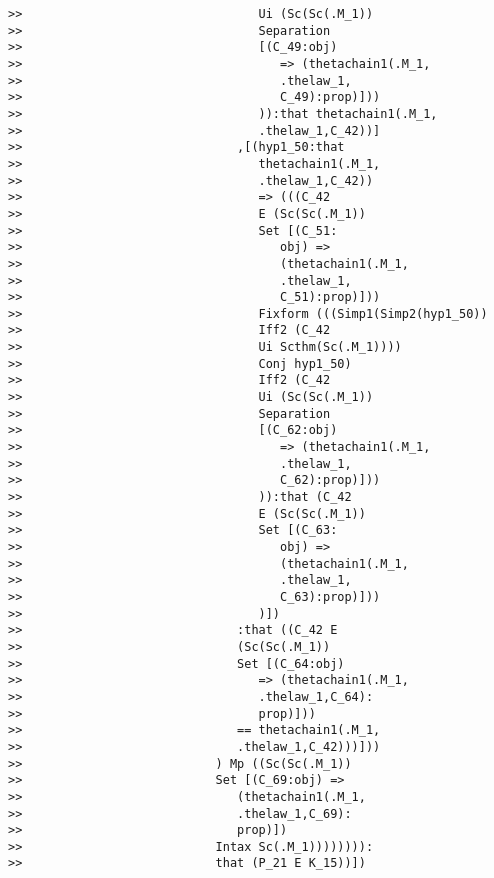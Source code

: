 \documentclass[12pt]{article}
\begin{document}
\begin{verbatim}
>>                                 Ui (Sc(Sc(.M_1))
>>                                 Separation
>>                                 [(C_49:obj)
>>                                    => (thetachain1(.M_1,
>>                                    .thelaw_1,
>>                                    C_49):prop)]))
>>                                 )):that thetachain1(.M_1,
>>                                 .thelaw_1,C_42))]
>>                              ,[(hyp1_50:that
>>                                 thetachain1(.M_1,
>>                                 .thelaw_1,C_42))
>>                                 => (((C_42
>>                                 E (Sc(Sc(.M_1))
>>                                 Set [(C_51:
>>                                    obj) =>
>>                                    (thetachain1(.M_1,
>>                                    .thelaw_1,
>>                                    C_51):prop)]))
>>                                 Fixform (((Simp1(Simp2(hyp1_50))
>>                                 Iff2 (C_42
>>                                 Ui Scthm(Sc(.M_1))))
>>                                 Conj hyp1_50)
>>                                 Iff2 (C_42
>>                                 Ui (Sc(Sc(.M_1))
>>                                 Separation
>>                                 [(C_62:obj)
>>                                    => (thetachain1(.M_1,
>>                                    .thelaw_1,
>>                                    C_62):prop)]))
>>                                 )):that (C_42
>>                                 E (Sc(Sc(.M_1))
>>                                 Set [(C_63:
>>                                    obj) =>
>>                                    (thetachain1(.M_1,
>>                                    .thelaw_1,
>>                                    C_63):prop)]))
>>                                 )])
>>                              :that ((C_42 E
>>                              (Sc(Sc(.M_1))
>>                              Set [(C_64:obj)
>>                                 => (thetachain1(.M_1,
>>                                 .thelaw_1,C_64):
>>                                 prop)]))
>>                              == thetachain1(.M_1,
>>                              .thelaw_1,C_42)))]))
>>                           ) Mp ((Sc(Sc(.M_1))
>>                           Set [(C_69:obj) =>
>>                              (thetachain1(.M_1,
>>                              .thelaw_1,C_69):
>>                              prop)])
>>                           Intax Sc(.M_1)))))))):
>>                           that (P_21 E K_15))])

\end{verbatim}
\end{document}

